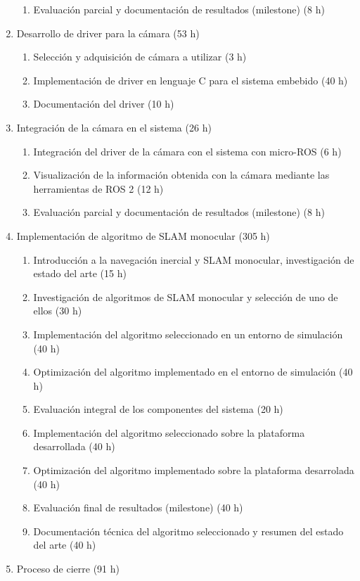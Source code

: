 \documentclass[
11pt, %
codirector, %
]{charter}
\begin{document}
\begin{enumerate}
\begin{enumerate}
		\item Evaluación parcial y documentación de resultados (milestone) (8 h)
	\end{enumerate}
	\item Desarrollo de driver para la cámara (53 h)
	\begin{enumerate}
		\item Selección y adquisición de cámara a utilizar (3 h)
		\item Implementación de driver en lenguaje C para el sistema embebido (40 h)
		\item Documentación del driver (10 h)
	\end{enumerate}
	\item Integración de la cámara en el sistema (26 h)
	\begin{enumerate}
		\item Integración del driver de la cámara con el sistema con micro-ROS (6 h)
		\item Visualización de la información obtenida con la cámara mediante las herramientas de ROS 2 (12 h)
		\item Evaluación parcial y documentación de resultados (milestone) (8 h)
	\end{enumerate}
	\item Implementación de algoritmo de SLAM monocular (305 h)
	\begin{enumerate}
		\item Introducción a la navegación inercial y SLAM monocular, investigación de estado del arte (15 h)
		\item Investigación de algoritmos de SLAM monocular y selección de uno de ellos (30 h)
		\item Implementación del algoritmo seleccionado en un entorno de simulación (40 h)
		\item Optimización del algoritmo implementado en el entorno de simulación (40 h)
		\item Evaluación integral de los componentes del sistema (20 h)
		\item Implementación del algoritmo seleccionado sobre la plataforma desarrollada (40 h)
		\item Optimización del algoritmo implementado sobre la plataforma desarrolada (40 h)
		\item Evaluación final de resultados (milestone) (40 h)
		\item Documentación técnica del algoritmo seleccionado y resumen del estado del arte (40 h)
	\end{enumerate}
	\item Proceso de cierre (91 h)

\end{enumerate}
\end{document}
